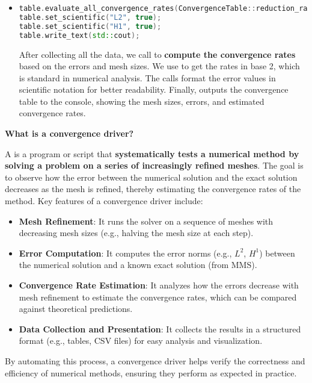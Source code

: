 \begin{itemize}
    \item {}
    \begin{lstlisting}[language=C++]
table.evaluate_all_convergence_rates(ConvergenceTable::reduction_rate_log2);
table.set_scientific("L2", true);
table.set_scientific("H1", true);
table.write_text(std::cout);\end{lstlisting}
    After collecting all the data, we call  to \textbf{compute the convergence rates} based on the errors and mesh sizes. We use  to get the rates in base 2, which is standard in numerical analysis. The  calls format the error values in scientific notation for better readability. Finally,  outputs the convergence table to the console, showing the mesh sizes, errors, and estimated convergence rates.
\end{itemize}

\begin{flushleft}
    \textcolor{Green3}{ \textbf{What is a convergence driver?}}
\end{flushleft}
A  is a program or script that \textbf{systematically tests a numerical method by solving a problem on a series of increasingly refined meshes}. The goal is to observe how the error between the numerical solution and the exact solution decreases as the mesh is refined, thereby estimating the convergence rates of the method. Key features of a convergence driver include:
\begin{itemize}
    \item \textbf{Mesh Refinement}: It runs the solver on a sequence of meshes with decreasing mesh sizes (e.g., halving the mesh size at each step).
    \item \textbf{Error Computation}: It computes the error norms (e.g., $L^2$, $H^1$) between the numerical solution and a known exact solution (from MMS).
    \item \textbf{Convergence Rate Estimation}: It analyzes how the errors decrease with mesh refinement to estimate the convergence rates, which can be compared against theoretical predictions.
    \item \textbf{Data Collection and Presentation}: It collects the results in a structured format (e.g., tables, CSV files) for easy analysis and visualization.
\end{itemize}
By automating this process, a convergence driver helps verify the correctness and efficiency of numerical methods, ensuring they perform as expected in practice.

